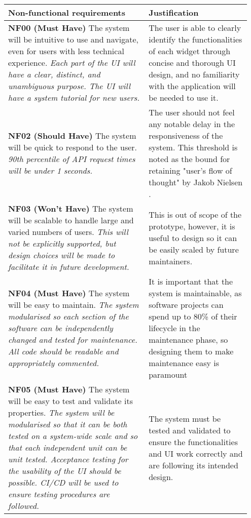 \documentclass[10pt]{article}
\begin{document}
\begin{longtable}{|p{0.55\linewidth}|p{0.4\linewidth}|}
    \hline
    \textbf{Non-functional requirements}
        &
    \textbf{Justification}
    \\ \hline\hline

    \textbf{NF00 (Must Have) }
    The system will be intuitive to use and navigate, even for users with less
    technical experience.
    \textit{Each part of the UI will have a clear, distinct, and unambiguous
    purpose. The UI will have a system tutorial for new users.}
        &
    The user is able to clearly identify the functionalities of each widget
    through concise and thorough UI design, and no familiarity with the
    application will be needed to use it.
    \\ \hline

    \textbf{NF02 (Should Have) }
    The system will be quick to respond to the user.
    \textit{90th percentile of API request times will be under 1 seconds.}
        &
    The user should not feel any notable delay in the responsiveness of the
    system. This threshold is noted as the bound for retaining "user's flow
    of thought" by Jakob Nielsen \cite{usability_engineering}.
    \\ \hline

    \textbf{NF03 (Won't Have) }
    The system will be scalable to handle large and varied numbers of users.
    \textit{This will not be explicitly supported, but design choices will be
    made to facilitate it in future development.}
        &
    This is out of scope of the prototype, however, it is useful to design so
    it can be easily scaled by future maintainers.
    \\ \hline

    \textbf{NF04 (Must Have) }
    The system will be easy to maintain.
    \textit{The system modularised so each section of the software can
    be independently changed and tested for maintenance. All code should be
    readable and appropriately commented.}
        &
    It is important that the system is maintainable, as software projects can
    spend up to 80\% of their lifecycle in the maintenance phase, so designing
    them to make maintenance easy is paramount
    \\ \hline

    \textbf{NF05 (Must Have) }
    The system will be easy to test and validate its properties.
    \textit{The system will be modularised so that it can be both tested on a
    system-wide scale and so that each independent unit can be unit tested.
    Acceptance testing for the usability of the UI should be possible.
    CI/CD will be used to ensure testing procedures are followed.}
        &
    The system must be tested and validated to ensure the functionalities and UI
    work correctly and are following its intended design.
    \\ \hline


\end{longtable}
\end{document}

